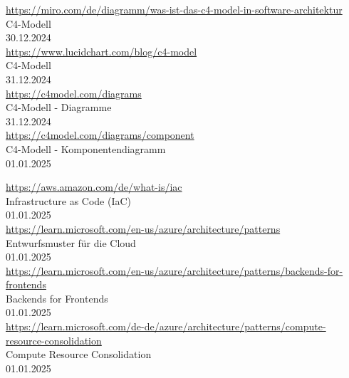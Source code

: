 \begin{thebibliography}{999}
    \href{https://miro.com/de/diagramm/was-ist-das-c4-model-in-software-architektur}{https://miro.com/de/diagramm/was-ist-das-c4-model-in-software-architektur} \\
    C4-Modell \\
    30.12.2024 \\

    \href{https://www.lucidchart.com/blog/c4-model}{https://www.lucidchart.com/blog/c4-model} \\
    C4-Modell \\
    31.12.2024 \\

    \href{https://c4model.com/diagrams}{https://c4model.com/diagrams} \\
    C4-Modell - Diagramme \\
    31.12.2024 \\

    \href{https://c4model.com/diagrams/component}{https://c4model.com/diagrams/component} \\
    C4-Modell - Komponentendiagramm \\
    01.01.2025 \\

    \clearpage

    \href{https://aws.amazon.com/de/what-is/iac}{https://aws.amazon.com/de/what-is/iac} \\
    Infrastructure as Code (IaC) \\
    01.01.2025 \\

    \href{https://learn.microsoft.com/en-us/azure/architecture/patterns}{https://learn.microsoft.com/en-us/azure/architecture/patterns} \\
    Entwurfsmuster für die Cloud \\
    01.01.2025 \\

    \href{https://learn.microsoft.com/en-us/azure/architecture/patterns/backends-for-frontends}{https://learn.microsoft.com/en-us/azure/architecture/patterns/backends-for-frontends} \\
    Backends for Frontends \\
    01.01.2025 \\

    \href{https://learn.microsoft.com/de-de/azure/architecture/patterns/compute-resource-consolidation}{https://learn.microsoft.com/de-de/azure/architecture/patterns/compute-resource-consolidation} \\
    Compute Resource Consolidation \\
    01.01.2025 \\


\end{thebibliography}

